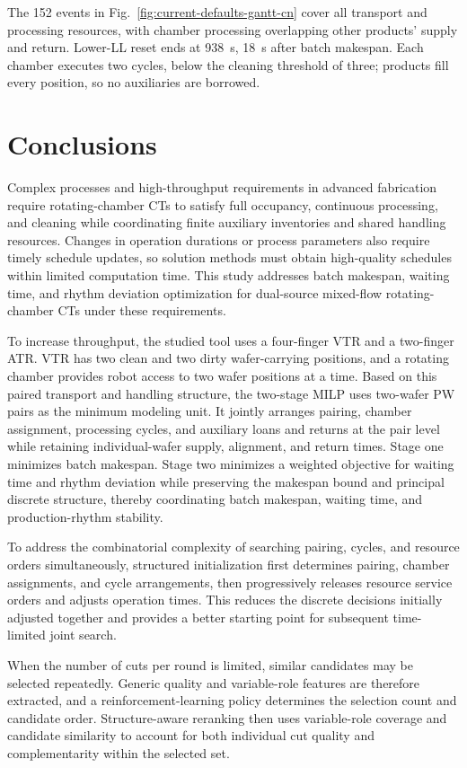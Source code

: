 \documentclass[final,5p,times,twocolumn]{elsarticle}
\begin{document}
The 152 events in Fig.~\ref{fig:current-defaults-gantt-cn} cover all transport and processing resources, with chamber processing overlapping other products' supply and return. Lower-LL reset ends at 938~s, 18~s after batch makespan. Each chamber executes two cycles, below the cleaning threshold of three; products fill every position, so no auxiliaries are borrowed.

\FloatBarrier
\section{Conclusions}
Complex processes and high-throughput requirements in advanced fabrication require rotating-chamber CTs to satisfy full occupancy, continuous processing, and cleaning while coordinating finite auxiliary inventories and shared handling resources. Changes in operation durations or process parameters also require timely schedule updates, so solution methods must obtain high-quality schedules within limited computation time. This study addresses batch makespan, waiting time, and rhythm deviation optimization for dual-source mixed-flow rotating-chamber CTs under these requirements.

To increase throughput, the studied tool uses a four-finger VTR and a two-finger ATR. VTR has two clean and two dirty wafer-carrying positions, and a rotating chamber provides robot access to two wafer positions at a time. Based on this paired transport and handling structure, the two-stage MILP uses two-wafer PW pairs as the minimum modeling unit. It jointly arranges pairing, chamber assignment, processing cycles, and auxiliary loans and returns at the pair level while retaining individual-wafer supply, alignment, and return times. Stage one minimizes batch makespan. Stage two minimizes a weighted objective for waiting time and rhythm deviation while preserving the makespan bound and principal discrete structure, thereby coordinating batch makespan, waiting time, and production-rhythm stability.

To address the combinatorial complexity of searching pairing, cycles, and resource orders simultaneously, structured initialization first determines pairing, chamber assignments, and cycle arrangements, then progressively releases resource service orders and adjusts operation times. This reduces the discrete decisions initially adjusted together and provides a better starting point for subsequent time-limited joint search.

When the number of cuts per round is limited, similar candidates may be selected repeatedly. Generic quality and variable-role features are therefore extracted, and a reinforcement-learning policy determines the selection count and candidate order. Structure-aware reranking then uses variable-role coverage and candidate similarity to account for both individual cut quality and complementarity within the selected set.
\end{document}
